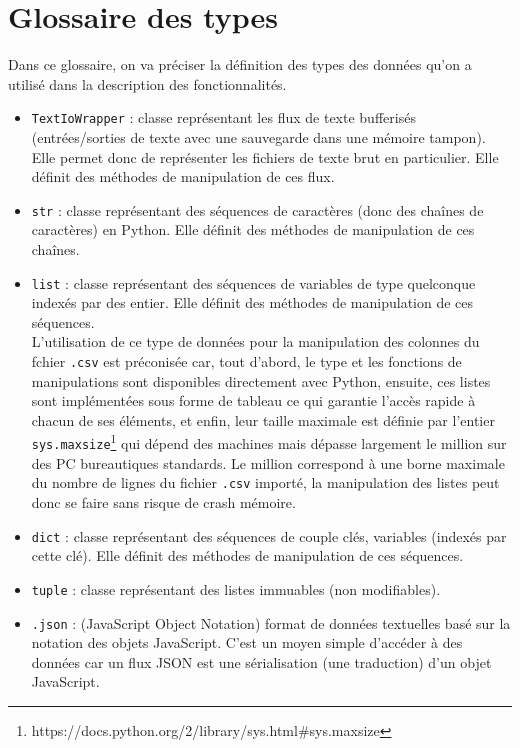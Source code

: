 	\section{Glossaire des types}
		Dans ce glossaire, on va préciser la définition des types des données qu'on a utilisé dans la description des fonctionnalités.
		\begin{itemize}
			\item \lstinline!TextIoWrapper! : classe représentant les flux de texte bufferisés (entrées/sorties de texte avec une sauvegarde dans une mémoire tampon). Elle permet donc de représenter les fichiers de texte brut en particulier. Elle définit des méthodes de manipulation de ces flux.
			\item \lstinline!str! : classe représentant des séquences de caractères (donc des chaînes de caractères) en Python. Elle définit des méthodes de manipulation de ces chaînes.
			\item \lstinline!list! : classe représentant des séquences de variables de type quelconque indexés par des entier. Elle définit des méthodes de manipulation de ces séquences.\\
				L'utilisation de ce type de données pour la manipulation des colonnes du fchier \lstinline!.csv! est préconisée car, tout d'abord, le type et les fonctions de manipulations sont disponibles directement avec Python, ensuite, ces listes sont implémentées sous forme de tableau ce qui garantie l'accès rapide à chacun de ses éléments, et enfin, leur taille maximale est définie par l'entier \lstinline!sys.maxsize!\footnote{https://docs.python.org/2/library/sys.html#sys.maxsize} qui dépend des machines mais dépasse largement le million sur des PC bureautiques standards. Le million correspond à une borne maximale du nombre de lignes du fichier \lstinline!.csv! importé, la manipulation des listes peut donc se faire sans risque de crash mémoire.
			\item \lstinline!dict! : classe représentant des séquences de couple clés, variables (indexés par cette clé). Elle définit des méthodes de manipulation de ces séquences.		
			\item \lstinline!tuple! : classe représentant des listes immuables (non modifiables).
			\item \lstinline!.json! : (JavaScript Object Notation) format de données textuelles basé sur la notation des objets JavaScript. C'est un moyen simple d'accéder à des données car un flux JSON est une sérialisation (une traduction) d'un objet JavaScript.
 		\end{itemize}
	
